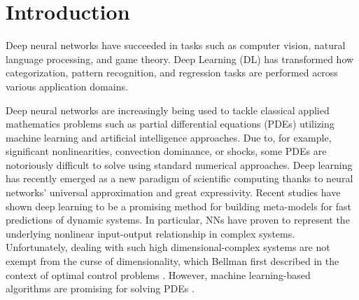 \documentclass[pdflatex,sn-basic]{sn-jnl}%
\theoremstyle{thmstyleone}%
\theoremstyle{thmstyletwo}%
\theoremstyle{thmstylethree}%
\begin{document}
\section{Introduction}\label{sec1}


Deep neural networks have succeeded in tasks such as computer vision, natural language processing, and game theory.
Deep Learning (DL) has transformed how categorization, pattern recognition, and regression tasks are performed across various application domains.


Deep neural networks are increasingly being used to tackle classical applied mathematics problems such as partial differential equations (PDEs) utilizing machine learning and artificial intelligence approaches.
Due to, for example, significant nonlinearities, convection dominance, or shocks, some PDEs are notoriously difficult to solve using standard numerical approaches. Deep learning has recently emerged as a new paradigm of scientific computing 
thanks to neural networks' universal approximation and great expressivity.
%
Recent studies have shown deep learning to be a promising method for building meta-models for fast predictions of dynamic systems. In particular, NNs have proven to represent the underlying nonlinear input-output relationship in complex systems. %
%
Unfortunately, dealing with such high dimensional-complex systems are not exempt from the curse of dimensionality, which Bellman first described in the context of optimal control problems \citep{bellman1966dynamic}.
%
However, machine learning-based algorithms are promising for solving PDEs \citep{Ble2021_ThreeWaysSolve_ErnBE}.
\end{document}

